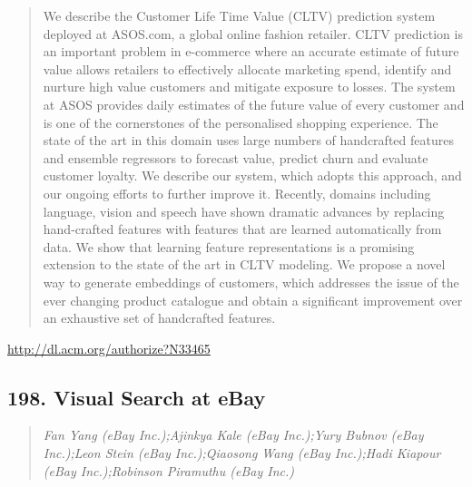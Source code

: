 \documentclass{article}
\begin{document}
\begin{quote}
We describe the Customer Life Time Value (CLTV) prediction system deployed at ASOS.com, a global online fashion retailer. CLTV prediction is an important problem in e-commerce where an accurate estimate of future value allows retailers to effectively allocate marketing spend, identify and nurture high value customers and mitigate exposure to losses. The system at ASOS provides daily estimates of the future value of every customer and is one of the cornerstones of the personalised shopping experience. The state of the art in this domain uses large numbers of handcrafted features and ensemble regressors to forecast value, predict churn and evaluate customer loyalty. We describe our system, which adopts this approach, and our ongoing efforts to further improve it. Recently, domains including language, vision and speech have shown dramatic advances by replacing hand-crafted features with features that are learned automatically from data. We show that learning feature representations is a promising extension to the state of the art in CLTV modeling. We propose a novel way to generate embeddings of customers, which addresses the issue of the ever changing product catalogue and obtain a significant improvement over an exhaustive set of handcrafted features.
\end{quote}

\href{http://dl.acm.org/authorize?N33465}{http://dl.acm.org/authorize?N33465}

\subsection{198. Visual Search at eBay}

\begin{quote}
\footnotesize{\textit{Fan Yang (eBay Inc.);Ajinkya Kale (eBay Inc.);Yury Bubnov (eBay Inc.);Leon Stein (eBay Inc.);Qiaosong Wang (eBay Inc.);Hadi Kiapour (eBay Inc.);Robinson Piramuthu (eBay Inc.)}}

\end{quote}
\end{document}
